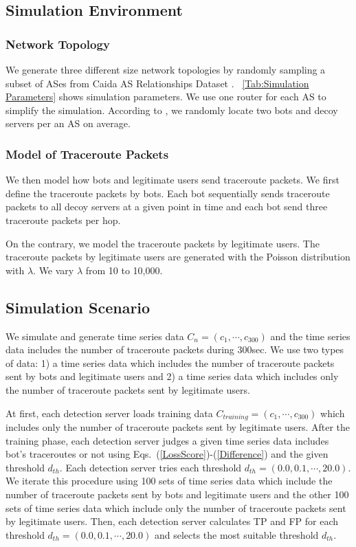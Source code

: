\documentclass[conference]{IEEEtran}
\begin{document}
  \subsection{Simulation Environment}\label{Sec:Simulation Environment}
  \subsubsection{Network Topology}\label{Sec:Network Topology}
    We generate three different size network topologies by randomly sampling a subset of ASes from Caida AS Relationships Dataset \cite{as-relation}.
    \tablename~\ref{Tab:Simulation Parameters} shows simulation parameters.
    We use one router for each AS to simplify the simulation.
    According to \cite{Crossfire}, we randomly locate two bots and decoy servers per an AS on average.
      
  \subsubsection{Model of Traceroute Packets}\label{Sec:Model of Traceroute Packets}
    We then model how bots and legitimate users send traceroute packets.
    We first define the traceroute packets by bots.
    Each bot sequentially sends traceroute packets to all decoy servers at a given point in time and each bot send three traceroute packets per hop.

    On the contrary, we model the traceroute packets by legitimate users.
    The traceroute packets by legitimate users are generated with the Poisson distribution with $\lambda$.
    We vary $\lambda$ from 10 to 10,000.

  \subsection{Simulation Scenario}\label{Sec:Simulation Scenario}
    We simulate and generate time series data $C_n = (c_1, \cdots, c_{300})$ and the time series data includes the number of traceroute packets during 300sec.
    We use two types of data: 1) a time series data which includes the number of traceroute packets sent by bots and legitimate users and 2) a time series data which includes only the number of traceroute packets sent by legitimate users.

    At first, each detection server loads training data $C_{training} = (c_1, \cdots, c_{300})$ which includes only the number of traceroute packets sent by legitimate users.
    After the training phase, each detection server judges a given time series data includes bot's traceroutes or not using Eqs.~(\ref{LossScore})-(\ref{Difference}) and the given threshold $d_{th}$.
    Each detection server tries each threshold $d_{th} = (0.0, 0.1, \cdots, 20.0)$.
    We iterate this procedure using 100 sets of time series data which include the number of traceroute packets sent by bots and legitimate users and the other 100 sets of time series data which include only the number of traceroute packets sent by legitimate users.
    Then, each detection server calculates TP and FP for each threshold $d_{th} = (0.0, 0.1, \cdots, 20.0)$ and selects the most suitable threshold $d_{th}$.
\end{document}
